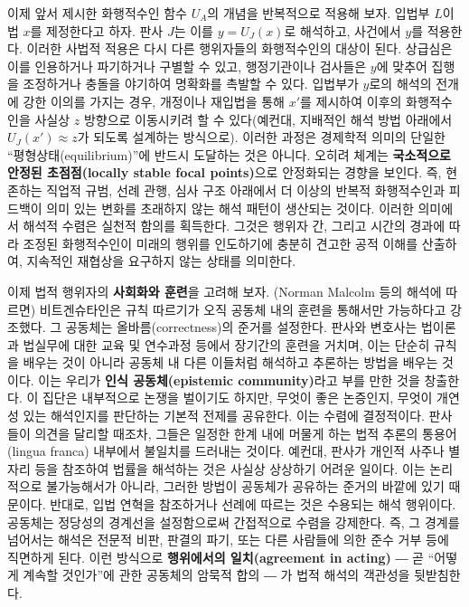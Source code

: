 \documentclass[12pt,a4paper]{article}
\begin{document}
이제 앞서 제시한 화행적수인 함수 \(U_A\)의 개념을 반복적으로 적용해
보자. 입법부 \(L\)이 법 \(x\)를 제정한다고 하자. 판사 \(J\)는 이를
\(y = U_J(x)\)로 해석하고, 사건에서 \(y\)를 적용한다. 이러한 사법적
적용은 다시 다른 행위자들의 화행적수인의 대상이 된다. 상급심은 이를
인용하거나 파기하거나 구별할 수 있고, 행정기관이나 검사들은 \(y\)에
맞추어 집행을 조정하거나 충돌을 야기하여 명확화를 촉발할 수 있다.
입법부가 \(y\)로의 해석의 전개에 강한 이의를 가지는 경우, 개정이나
재입법을 통해 \(x'\)를 제시하여 이후의 화행적수인을 사실상 \(z\)
방향으로 이동시키려 할 수 있다(예컨대, 지배적인 해석 방법 아래에서
\(U_J(x') \approx z\)가 되도록 설계하는 방식으로). 이러한 과정은
경제학적 의미의 단일한 ``평형상태(equilibrium)''에 반드시 도달하는 것은
아니다. 오히려 체계는 \textbf{국소적으로 안정된 초점점(locally stable
focal points)}으로 안정화되는 경향을 보인다. 즉, 현존하는 직업적 규범,
선례 관행, 심사 구조 아래에서 더 이상의 반복적 화행적수인과 피드백이
의미 있는 변화를 초래하지 않는 해석 패턴이 생산되는 것이다. 이러한
의미에서 해석적 수렴은 실천적 함의를 획득한다. 그것은 행위자 간, 그리고
시간의 경과에 따라 조정된 화행적수인이 미래의 행위를 인도하기에 충분히
견고한 공적 이해를 산출하여, 지속적인 재협상을 요구하지 않는 상태를
의미한다.

이제 법적 행위자의 \textbf{사회화와 훈련}을 고려해 보자. (Norman Malcolm
등의 해석에 따르면) 비트겐슈타인은 규칙 따르기가 오직 공동체 내의 훈련을
통해서만 가능하다고 강조했다. 그 공동체는 올바름(correctness)의 준거를
설정한다\autocite{malcolm1989}. 판사와 변호사는 법이론과 법실무에 대한 교육
및 연수과정 등에서 장기간의 훈련을 거치며, 이는 단순히 규칙을 배우는
것이 아니라 공동체 내 다른 이들처럼 \textsf{해석하고 추론하는 방법}을
배우는 것이다. 이는 우리가 \textbf{인식 공동체(epistemic community)}라고
부를 만한 것을 창출한다. 이 집단은 내부적으로 논쟁을 벌이기도 하지만,
무엇이 좋은 논증인지, 무엇이 개연성 있는 해석인지를 판단하는 기본적
전제를 공유한다. 이는 수렴에 결정적이다. 판사들이 의견을 달리할 때조차,
그들은 일정한 한계 내에 머물게 하는 법적 추론의 통용어(lingua franca)
내부에서 불일치를 드러내는 것이다. 예컨대, 판사가 개인적 사주나 별자리
등을 참조하여 법률을 해석하는 것은 사실상 상상하기 어려운 일이다. 이는
논리적으로 불가능해서가 아니라, 그러한 방법이 공동체가 공유하는 준거의
바깥에 있기 때문이다. 반대로, 입법 연혁을 참조하거나 선례에 따르는 것은
수용되는 해석 행위이다. 공동체는 정당성의 경계선을 설정함으로써
간접적으로 수렴을 강제한다. 즉, 그 경계를 넘어서는 해석은 전문적 비판,
판결의 파기, 또는 다른 사람들에 의한 준수 거부 등에 직면하게 된다. 이런
방식으로 \textbf{행위에서의 일치(agreement in acting)} ― 곧 ``어떻게
계속할 것인가''에 관한 공동체의 암묵적 합의 ― 가 법적 해석의 객관성을
뒷받침한다.
\end{document}

